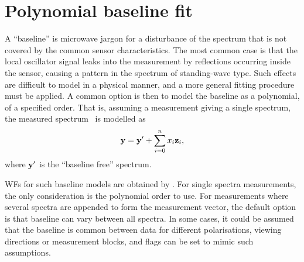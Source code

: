 \section{Polynomial baseline fit}
\label{sec:wfuns:polyfit}

A ``baseline'' is microwave jargon for a disturbance of the spectrum that is
not covered by the common sensor characteristics. The most common case is that
the local oscillator signal leaks into the measurement by reflections occurring
inside the sensor, causing a pattern in the spectrum of standing-wave type.
Such effects are difficult to model in a physical manner, and a more general
fitting procedure must be applied. A common option is then to model the
baseline as a polynomial, of a specified order. That is, assuming a measurement
giving a single spectrum, the measured spectrum \MsrVct\ is modelled as
\begin{equation}
  \label{eq:polyfit}
  \mathbf{y} = \mathbf{y}' + \sum_{i=0}^n x_i\mathbf{z}_i,
\end{equation}
where $\mathbf{y}'$ is the ``baseline free'' spectrum.

WFs for such baseline models are obtained by . For
single spectra measurements, the only consideration is the polynomial order to
use. For measurements where several spectra are appended to form the measurement
vector, the default option is that baseline can vary between all spectra. In
some cases, it could be assumed that the baseline is common between data for
different polarisations, viewing directions or measurement blocks, and flags
can be set to mimic such assumptions.


